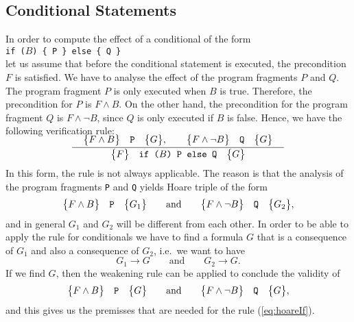 \subsection{Conditional Statements}
In order to compute the effect of a conditional of the form
\\[0.2cm]
\hspace*{1.3cm}
\texttt{if ($B$) \{ P \} else \{  Q \}}
\\[0.2cm]
let us assume that before the conditional statement is executed, the
precondition $F$ is satisfied.   We have to analyse the effect of the program fragments $P$ and $Q$.
The program fragment $P$ is only executed when $B$ is true.  Therefore, the precondition for $P$ is 
$F \wedge B$.  On the other hand, the precondition for the program fragment $Q$ is $F \wedge \neg B$,
since $Q$ is only executed if $B$ is false.
Hence, we have the following verification rule:
\begin{equation}
  \label{eq:hoareIf}
  \bruch{\quad\hoare{F \wedge B}{P}{G}, \qquad \hoare{F \wedge \neg B}{Q}{G}\quad}{
              \hoare{F}{if ($B$) P else Q}{G}}  
\end{equation}
In this form, the rule is not always applicable.  The reason is that the analysis of the program
fragments \texttt{P} and \texttt{Q} yields Hoare triple of the form
\begin{equation}
  \label{eq:hoareI}
 \bigl\{F \wedge B\bigr\}\quad\texttt{P}\quad\bigl\{G_1\bigr\} \qquad \mathrm{and} \qquad \bigl\{F \wedge \neg B\bigr\}\quad\texttt{Q}\quad\bigl\{G_2\bigr\},   
\end{equation}
and in general $G_1$ and $G_2$ will be different from each other.  In order to be able to apply the
rule for conditionals we have to find a formula $G$ that is a consequence of $G_1$ and also a
consequence of $G_2$, i.e.~we want to have
\[ G_1 \rightarrow G \qquad \mathrm{and} \qquad G_2 \rightarrow G. \]
If we find $G$, then the weakening rule  can be applied to conclude the validity of
\[ \bigl\{F \wedge B\bigr\}\quad\texttt{P}\quad\bigl\{G\bigr\} \qquad \mathrm{and} \qquad \bigl\{F \wedge \neg B\bigr\}\quad\texttt{Q}\quad\bigl\{G\bigr\},    \] 
and this gives us the premisses that are needed for the rule
(\ref{eq:hoareIf}).

